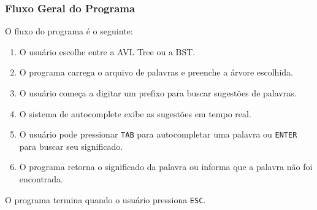\documentclass{article}
\begin{document}
\subsubsection{Fluxo Geral do Programa}
O fluxo do programa é o seguinte:
\begin{enumerate}
    \item O usuário escolhe entre a AVL Tree ou a BST.
    \item O programa carrega o arquivo de palavras e preenche a árvore escolhida.
    \item O usuário começa a digitar um prefixo para buscar sugestões de palavras.
    \item O sistema de autocomplete exibe as sugestões em tempo real.
    \item O usuário pode pressionar \texttt{TAB} para autocompletar uma palavra ou \texttt{ENTER} para buscar seu significado.
    \item O programa retorna o significado da palavra ou informa que a palavra não foi encontrada.
\end{enumerate}

O programa termina quando o usuário pressiona \texttt{ESC}.
\end{document}
